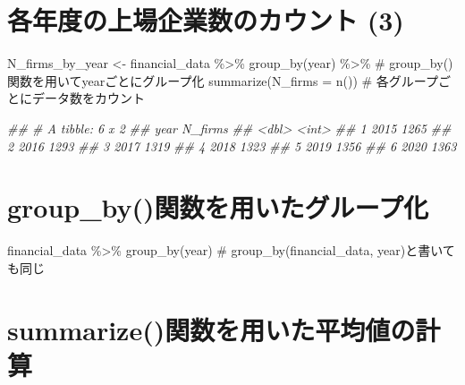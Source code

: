 \documentclass[
  letterpaper,
  DIV=11,
  numbers=noendperiod]{scrreprt}
\newenvironment{Shaded}{\begin{snugshade}}{\end{snugshade}}
\newcommand{\AttributeTok}[1]{\textcolor[rgb]{0.40,0.45,0.13}{#1}}
\newcommand{\CommentTok}[1]{\textcolor[rgb]{0.37,0.37,0.37}{#1}}
\newcommand{\DocumentationTok}[1]{\textcolor[rgb]{0.37,0.37,0.37}{\textit{#1}}}
\newcommand{\FunctionTok}[1]{\textcolor[rgb]{0.28,0.35,0.67}{#1}}
\newcommand{\NormalTok}[1]{\textcolor[rgb]{0.00,0.23,0.31}{#1}}
\newcommand{\OtherTok}[1]{\textcolor[rgb]{0.00,0.23,0.31}{#1}}
\newcommand{\SpecialCharTok}[1]{\textcolor[rgb]{0.37,0.37,0.37}{#1}}
\begin{document}
\section{各年度の上場企業数のカウント
(3)}\label{ux5404ux5e74ux5ea6ux306eux4e0aux5834ux4f01ux696dux6570ux306eux30abux30a6ux30f3ux30c8-3}

\begin{Shaded}
\begin{Highlighting}[]
\NormalTok{N\_firms\_by\_year }\OtherTok{\textless{}{-}}\NormalTok{ financial\_data }\SpecialCharTok{\%\textgreater{}\%} 
  \FunctionTok{group\_by}\NormalTok{(year) }\SpecialCharTok{\%\textgreater{}\%} \CommentTok{\# group\_by()関数を用いてyearごとにグループ化}
  \FunctionTok{summarize}\NormalTok{(}\AttributeTok{N\_firms =} \FunctionTok{n}\NormalTok{()) }\CommentTok{\# 各グループごとにデータ数をカウント}

\DocumentationTok{\#\# \# A tibble: 6 x 2}
\DocumentationTok{\#\#    year N\_firms}
\DocumentationTok{\#\#   \textless{}dbl\textgreater{}   \textless{}int\textgreater{}}
\DocumentationTok{\#\# 1  2015    1265}
\DocumentationTok{\#\# 2  2016    1293}
\DocumentationTok{\#\# 3  2017    1319}
\DocumentationTok{\#\# 4  2018    1323}
\DocumentationTok{\#\# 5  2019    1356}
\DocumentationTok{\#\# 6  2020    1363}
\end{Highlighting}
\end{Shaded}

\section{group\_by()関数を用いたグループ化}\label{group_byux95a2ux6570ux3092ux7528ux3044ux305fux30b0ux30ebux30fcux30d7ux5316}

\begin{Shaded}
\begin{Highlighting}[]
\NormalTok{financial\_data }\SpecialCharTok{\%\textgreater{}\%} \FunctionTok{group\_by}\NormalTok{(year) }\CommentTok{\# group\_by(financial\_data, year)と書いても同じ}
\end{Highlighting}
\end{Shaded}

\section{summarize()関数を用いた平均値の計算}\label{summarizeux95a2ux6570ux3092ux7528ux3044ux305fux5e73ux5747ux5024ux306eux8a08ux7b97}
\end{document}
